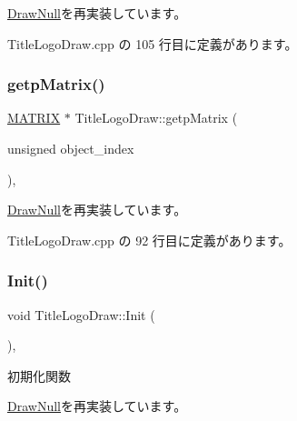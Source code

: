 \mbox{\hyperlink{class_draw_null_aa07d7e89e723b68ec257da0f63d43f70}{Draw\+Null}}を再実装しています。



 Title\+Logo\+Draw.\+cpp の 105 行目に定義があります。

\mbox{\label{class_title_logo_draw_a34fa4366f1ff190a08a36f8e402f6941}} 
\subsubsection{\texorpdfstring{getp\+Matrix()}{getpMatrix()}}
{\footnotesize\ttfamily \mbox{\hyperlink{_vector3_d_8h_a032295cd9fb1b711757c90667278e744}{M\+A\+T\+R\+IX}} $\ast$ Title\+Logo\+Draw\+::getp\+Matrix (\begin{DoxyParamCaption}\item[{unsigned}]{object\+\_\+index }\end{DoxyParamCaption})\hspace{0.3cm}{\ttfamily [override]}, {\ttfamily [virtual]}}



\mbox{\hyperlink{class_draw_null_a001901c340671106a33d44b9d4aef4c4}{Draw\+Null}}を再実装しています。



 Title\+Logo\+Draw.\+cpp の 92 行目に定義があります。

\mbox{\label{class_title_logo_draw_a9f70fb70639510908f4e07ee14667e30}} 
\subsubsection{\texorpdfstring{Init()}{Init()}}
{\footnotesize\ttfamily void Title\+Logo\+Draw\+::\+Init (\begin{DoxyParamCaption}{ }\end{DoxyParamCaption})\hspace{0.3cm}{\ttfamily [override]}, {\ttfamily [virtual]}}



初期化関数 



\mbox{\hyperlink{class_draw_null_acd7fef3ccea1da537ac9507ffbb6dd2e}{Draw\+Null}}を再実装しています。



